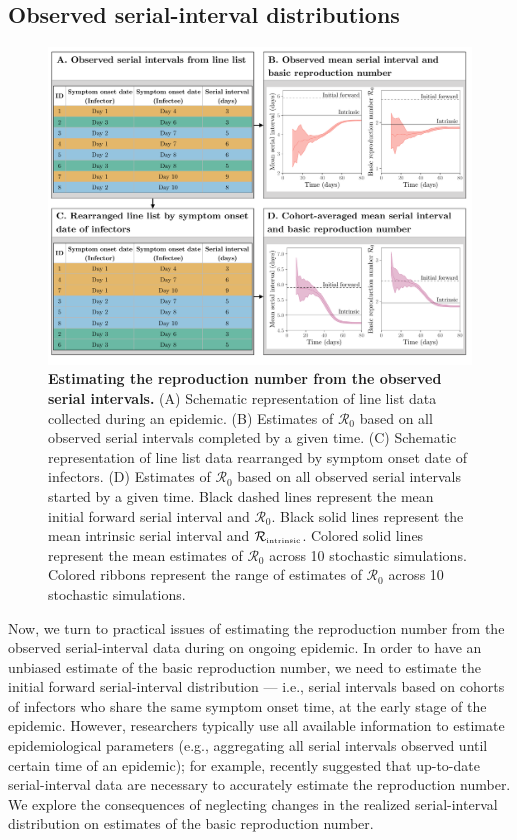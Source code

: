 \documentclass[12pt]{article}
\newcommand{\Rx}[1]{\ensuremath{{\mathcal R}_{#1}}\xspace}
\newcommand{\Ro}{\Rx{0}}
\newcommand{\Rintrinsic}{\ensuremath{{\mathcal R}_{\textrm{\tiny intrinsic}}}\xspace}
\begin{document}
\subsection{Observed serial-interval distributions}

\begin{figure}[!ht]
\includegraphics[width=\textwidth]{diagram.pdf}
\caption{
\textbf{Estimating the reproduction number from the observed serial intervals.}
(A) Schematic representation of line list data collected during an epidemic.
(B) Estimates of \Ro based on all observed serial intervals completed by a given time.
(C) Schematic representation of line list data rearranged by symptom onset date of infectors.
(D) Estimates of \Ro based on all observed serial intervals started by a given time. 
Black dashed lines represent the mean initial forward serial interval and \Ro.
Black solid lines represent the mean intrinsic serial interval and \Rintrinsic.
Colored solid lines represent the mean estimates of \Ro across 10 stochastic simulations.
Colored ribbons represent the range of estimates of \Ro across 10 stochastic simulations.
}
\label{fig:obsrR}
\end{figure}

Now, we turn to practical issues of estimating the reproduction number from the observed serial-interval data during on ongoing epidemic.
In order to have an unbiased estimate of the basic reproduction number, we need to estimate the initial forward serial-interval distribution --- i.e., serial intervals based on cohorts of infectors who share the same symptom onset time, at the early stage of the epidemic.
However, researchers typically use all available information to estimate epidemiological parameters (e.g., aggregating all serial intervals observed until certain time of an epidemic);
for example, \cite{thompson2019improved} recently suggested that up-to-date serial-interval data are necessary to accurately estimate the reproduction number.
We explore the consequences of neglecting changes in the realized serial-interval distribution on estimates of the basic reproduction number.
\end{document}

